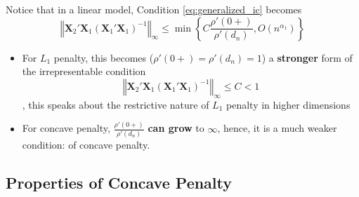 \documentclass[twoside]{article}
\begin{document}
Notice that in a linear model, Condition \ref{eq:generalized_ic} becomes 
$$
\left\Vert \mathbf{X}_2' \mathbf{X}_1 \left(\mathbf{X}_1'\mathbf{X}_1\right)^{-1} \right\Vert _{\infty} \leq \min \left\{ C\frac{\rho'(0+)}{\rho'(d_n)}, O(n^{\alpha_1})\right\}
$$
\begin{itemize}
    \item For $L_1$ penalty, this becomes ($\rho'(0+)=\rho'(d_n)=1$) a \textbf{stronger} form of the irrepresentable condition $$ \left\Vert \mathbf{X}_2' \mathbf{X}_1 \left(\mathbf{X}_1'\mathbf{X}_1\right)^{-1} \right\Vert _{\infty} \leq C <1 $$, this speaks about the restrictive nature of $L_1$ penalty in higher dimensions
    \item For concave penalty, $\frac{\rho'(0+)}{\rho'(d_n)}$ \textbf{can grow} to $\infty$, hence, it is a much weaker condition:  of concave penalty.
\end{itemize}

\subsection{Properties of Concave Penalty}


\newpage


\end{document}

